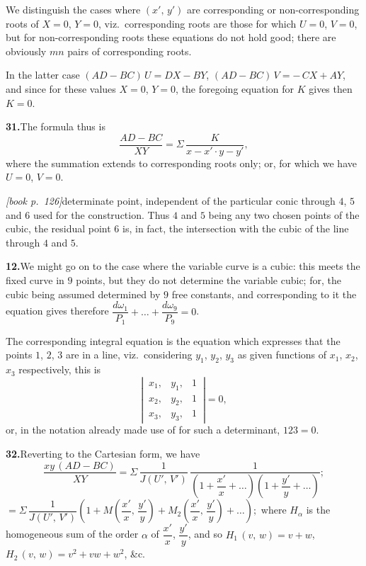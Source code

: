 \documentclass[11pt,a4paper]{article}
\theoremstyle{plain}
\theoremstyle{definition}
\theoremstyle{remark}
\begin{document}
We distinguish the cases where $(x',\,y')$ are corresponding or non-corresponding roots of $X = 0$, $Y = 0$, viz.\ corresponding roots are those for which $U = 0$, $V = 0$, but for non-corresponding roots these equations do not hold good; there are obviously $mn$ pairs of corresponding roots.

In the latter case $(AD - BC)\,U = DX - BY$, $(AD - BC)\,V = -\,CX + AY$, and since for these values $X = 0$, $Y = 0$, the foregoing equation for $K$ gives then $K = 0$.

\medskip\noindent\textbf{31.}\quad The formula thus is
\[
\frac{AD - BC}{XY} = \Sigma\,\frac{K}{x - x'\cdot y - y'},
\]
where the summation extends to corresponding roots only; or, for which we have $U = 0$, $V = 0$.

\noindent\textit{[book p.~126]}\quad determinate point, independent of the particular conic through $4$, $5$ and $6$ used for the construction. Thus $4$ and $5$ being any two chosen points of the cubic, the residual point $6$ is, in fact, the intersection with the cubic of the line through $4$ and $5$.

\medskip\noindent\textbf{12.}\quad We might go on to the case where the variable curve is a cubic: this meets the fixed curve in $9$ points, but they do not determine the variable cubic; for, the cubic being assumed determined by $9$ free constants, and corresponding to it the equation gives therefore $\dfrac{d\omega_1}{P_1} + \ldots + \dfrac{d\omega_9}{P_9} = 0$.

The corresponding integral equation is the equation which expresses that the points $1$, $2$, $3$ are in a line, viz.\ considering $y_1$, $y_2$, $y_3$ as given functions of $x_1$, $x_2$, $x_3$ respectively, this is
\[
\left|\,\begin{array}{ccc}
x_1, & y_1, & 1\\
x_2, & y_2, & 1\\
x_3, & y_3, & 1
\end{array}\,\right| = 0,
\]
or, in the notation already made use of for such a determinant, $123 = 0$.

\medskip\noindent\textbf{32.}\quad Reverting to the Cartesian form, we have
\[
\frac{xy\,(AD - BC)}{XY} = \Sigma\,\frac{1}{J(U',\,V')}\,\frac{1}{\left(1 + \dfrac{x'}{x} + \ldots\right)\left(1 + \dfrac{y'}{y} + \ldots\right)};
\]
$= \Sigma\,\dfrac{1}{J(U',\,V')}\left(1 + M\left(\dfrac{x'}{x},\,\dfrac{y'}{y}\right) + M_2\left(\dfrac{x'}{x},\,\dfrac{y'}{y}\right) + \ldots\right);$
where $H_\alpha$ is the homogeneous sum of the order $\alpha$ of $\dfrac{x'}{x}$, $\dfrac{y'}{y}$, and so $H_1\,(v,\,w) = v + w$, $H_2\,(v,\,w) = v^2 + vw + w^2$, \&c.
\end{document}
